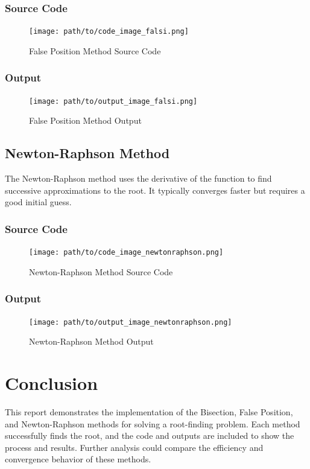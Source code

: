 \documentclass{scrreprt}
\begin{document}
\subsubsection{Source Code}
\begin{figure}[h]
    \centering
    \texttt{[image: path/to/code\_image\_falsi.png]}
    \caption{False Position Method Source Code}
\end{figure}

\subsubsection{Output}
\begin{figure}[h]
    \centering
    \texttt{[image: path/to/output\_image\_falsi.png]}
    \caption{False Position Method Output}
\end{figure}

\subsection{Newton-Raphson Method}
The Newton-Raphson method uses the derivative of the function to find successive approximations to the root. It typically converges faster but requires a good initial guess.

\subsubsection{Source Code}
\begin{figure}[h]
    \centering
    \texttt{[image: path/to/code\_image\_newtonraphson.png]}
    \caption{Newton-Raphson Method Source Code}
\end{figure}

\subsubsection{Output}
\begin{figure}[h]
    \centering
    \texttt{[image: path/to/output\_image\_newtonraphson.png]}
    \caption{Newton-Raphson Method Output}
\end{figure}

\section{Conclusion}
This report demonstrates the implementation of the Bisection, False Position, and Newton-Raphson methods for solving a root-finding problem. Each method successfully finds the root, and the code and outputs are included to show the process and results. Further analysis could compare the efficiency and convergence behavior of these methods.
\end{document}
